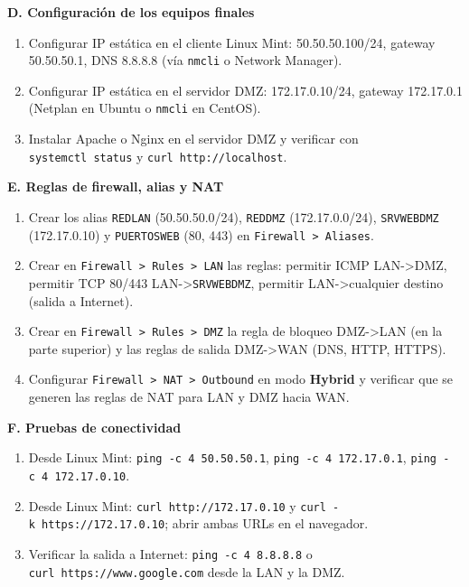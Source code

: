 \documentclass{article}
\providecommand{\tightlist}{%
  \setlength{\itemsep}{0pt}\setlength{\parskip}{0pt}}
\renewcommand{\_}{\oldunderscore\hskip0pt\relax}
\begin{document}
\textbf{D. Configuración de los equipos finales}

\begin{enumerate}
\def\labelenumi{\arabic{enumi}.}
\setcounter{enumi}{12}
\tightlist
\item
  Configurar IP estática en el cliente Linux Mint: 50.50.50.100/24,
  gateway 50.50.50.1, DNS 8.8.8.8 (vía \texttt{nmcli} o Network
  Manager).
\item
  Configurar IP estática en el servidor DMZ: 172.17.0.10/24, gateway
  172.17.0.1 (Netplan en Ubuntu o \texttt{nmcli} en CentOS).
\item
  Instalar Apache o Nginx en el servidor DMZ y verificar con
  \texttt{systemctl\ status} y \texttt{curl\ http://localhost}.
\end{enumerate}

\textbf{E. Reglas de firewall, alias y NAT}

\begin{enumerate}
\def\labelenumi{\arabic{enumi}.}
\setcounter{enumi}{15}
\tightlist
\item
  Crear los alias \texttt{RED\_LAN} (50.50.50.0/24), \texttt{RED\_DMZ}
  (172.17.0.0/24), \texttt{SRV\_WEB\_DMZ} (172.17.0.10) y
  \texttt{PUERTOS\_WEB} (80, 443) en
  \texttt{Firewall\ \textgreater{}\ Aliases}.
\item
  Crear en \texttt{Firewall\ \textgreater{}\ Rules\ \textgreater{}\ LAN}
  las reglas: permitir ICMP LAN-\textgreater DMZ, permitir TCP 80/443
  LAN-\textgreater{}\texttt{SRV\_WEB\_DMZ}, permitir
  LAN-\textgreater cualquier destino (salida a Internet).
\item
  Crear en \texttt{Firewall\ \textgreater{}\ Rules\ \textgreater{}\ DMZ}
  la regla de bloqueo DMZ-\textgreater LAN (en la parte superior) y las
  reglas de salida DMZ-\textgreater WAN (DNS, HTTP, HTTPS).
\item
  Configurar
  \texttt{Firewall\ \textgreater{}\ NAT\ \textgreater{}\ Outbound} en
  modo \textbf{Hybrid} y verificar que se generen las reglas de NAT para
  LAN y DMZ hacia WAN.
\end{enumerate}

\textbf{F. Pruebas de conectividad}

\begin{enumerate}
\def\labelenumi{\arabic{enumi}.}
\setcounter{enumi}{19}
\tightlist
\item
  Desde Linux Mint: \texttt{ping\ -c\ 4\ 50.50.50.1},
  \texttt{ping\ -c\ 4\ 172.17.0.1}, \texttt{ping\ -c\ 4\ 172.17.0.10}.
\item
  Desde Linux Mint: \texttt{curl\ http://172.17.0.10} y
  \texttt{curl\ -k\ https://172.17.0.10}; abrir ambas URLs en el
  navegador.
\item
  Verificar la salida a Internet: \texttt{ping\ -c\ 4\ 8.8.8.8} o
  \texttt{curl\ https://www.google.com} desde la LAN y la DMZ.
\end{enumerate}
\end{document}
